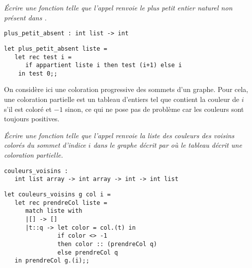 \begin{Exercise}\it
Écrire une fonction  telle que l'appel 
renvoie le plus petit entier naturel non présent dans .
\end{Exercise}  
\begin{lstlisting}
plus_petit_absent : int list -> int
\end{lstlisting}
\begin{Answer}
\begin{lstlisting}
let plus_petit_absent liste =
   let rec test i =
      if appartient liste i then test (i+1) else i 
    in test 0;;
\end{lstlisting} 
\newpage
\end{Answer}
On considère ici une coloration progressive des sommets d'un graphe. Pour cela, une coloration partielle est un tableau d'entiers  tel que  contient la couleur de $i$ s'il est coloré et $-1$ sinon, ce qui ne pose pas de problème car les couleurs sont toujours positives.
\begin{Exercise}\it
Écrire une fonction  telle que l'appel  renvoie la liste des couleurs des voisins colorés du sommet d'indice $i$ dans le graphe décrit par
 où le tableau  décrit une coloration partielle.
\end{Exercise}  
\begin{lstlisting}
couleurs_voisins : 
   int list array -> int array -> int -> int list
\end{lstlisting}
\begin{Answer}
\begin{lstlisting}
let couleurs_voisins g col i =
   let rec prendreCol liste =
      match liste with
      |[] -> []
      |t::q -> let color = col.(t) in
               if color <> -1 
               then color :: (prendreCol q)
               else prendreCol q 
   in prendreCol g.(i);;
\end{lstlisting}
\end{Answer}

